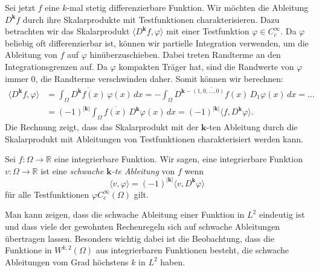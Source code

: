 Sei jetzt $f$ eine $k$-mal stetig differenzierbare Funktion.
Wir möchten die Ableitung $D^{\bm{k}}f$ durch ihre Skalarprodukte mit
Testfunktionen charakterisieren.
Dazu betrachten wir das Skalarprodukt
\(
\langle D^{\bm{k}}f,\varphi\rangle
\)
mit einer Testfunktion $\varphi\in C_c^{\infty}$.
Da $\varphi$ beliebig oft differenzierbar ist, können wir
partielle Integration verwenden, um die Ableitung von $f$ auf $\varphi$
hinüberzuschieben.
Dabei treten Randterme an den Integrationsgrenzen auf.
Da $\varphi$ kompakten Träger hat, sind die Randwerte von $\varphi$
immer 0, die Randterme verschwinden daher.
Somit können wir berechnen:
\begin{align*}
\langle D^{\bm{k}}f,\varphi\rangle
&=
\int_{\Omega} \overline{D^{\bm{k}}f(x)}\, \varphi(x)\,dx
=
-\int_{\Omega}
\overline{D^{\bm{k}-(1,0,\dots,0)}f(x)}\, 
D_1 \varphi(x)
\,dx
= \dots
\\
&=
(-1)^{|\bm{k}|} \int_{\Omega} \overline{f(x)} \, D^{\bm{k}}\varphi(x) \,dx
=
(-1)^{|\bm{k}|} \langle f,D^{\bm{k}}\varphi\rangle.
\end{align*}
Die Rechnung zeigt, dass das Skalarprodukt mit der $\bm{k}$-ten
Ableitung durch die Skalarprodukt mit Ableitungen von Testfunktionen
charakterisiert werden kann.

\begin{definition}
Sei $f\colon\Omega\to\mathbb{R}$  eine integrierbare Funktion.
Wir sagen, eine integrierbare Funktion $v\colon\Omega\to\mathbb{R}$ 
ist eine {\em schwache $\bm{k}$-te Ableitung} von $f$ wenn 
\[
\langle v,\varphi\rangle
=
(-1)^{|\bm{k}|} \langle v,D^{\bm{k}}\varphi\rangle
\]
für alle Testfunktionen $\varphi C_c^{\infty}(\Omega)$ gilt.
\end{definition}

Man kann zeigen, dass die schwache Ableitung einer Funktion
in $L^2$ eindeutig ist und dass viele der gewohnten Rechenregeln
sich auf schwache Ableitungen übertragen lassen.
Besonders wichtig dabei ist die Beobachtung, dass die Funktione
in $W^{k,2}(\Omega)$ aus integrierbaren Funktionen besteht, die 
schwache Ableitungen vom Grad höchstens $k$ in $L^2$ haben.

